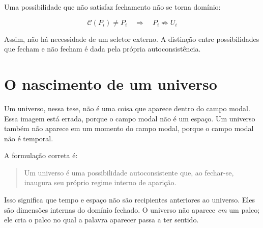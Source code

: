 \documentclass[11pt,a4paper]{article}
\newcommand{\CMP}{\mathcal{M}}
\newcommand{\Ui}{U_i}
\newcommand{\PiM}{P_i}
\newcommand{\Closure}{\mathcal{C}}
\begin{document}
Uma possibilidade que não satisfaz fechamento não se torna domínio:

\[
\Closure(\PiM) \neq \PiM \quad \Rightarrow \quad \PiM \nRightarrow \Ui
\]

Assim, não há necessidade de um seletor externo. A distinção entre possibilidades que fecham e não fecham é dada pela própria autoconsistência.

\section{O nascimento de um universo}

Um universo, nessa tese, não é uma coisa que aparece dentro do campo modal. Essa imagem está errada, porque o campo modal não é um espaço. Um universo também não aparece em um momento do campo modal, porque o campo modal não é temporal.

A formulação correta é:

\begin{quote}
Um universo é uma possibilidade autoconsistente que, ao fechar-se, inaugura seu próprio regime interno de aparição.
\end{quote}

Isso significa que tempo e espaço não são recipientes anteriores ao universo. Eles são dimensões internas do domínio fechado. O universo não aparece \emph{em} um palco; ele cria o palco no qual a palavra aparecer passa a ter sentido.

\begin{center}
\end{center}
\end{document}
